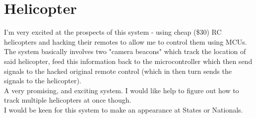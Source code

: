 		\chapter{Helicopter}
        	\label{helicopter_system}
			I'm very excited at the prospects of this system - using cheap (\$30) RC helicopters and hacking their remotes to allow me to control them using MCUs.\\
			
			The system basically involves two "camera beacons" which track the location of said helicopter, feed this information back to the microcontroller which then send signals to the hacked original remote control (which in then turn sends the signals to the helicopter).\\
			
			A very promising, and exciting system. I would like help to figure out how to track multiple helicopters at once though.\\
			
			I would be keen for this system to make an appearance at States or Nationals.\\